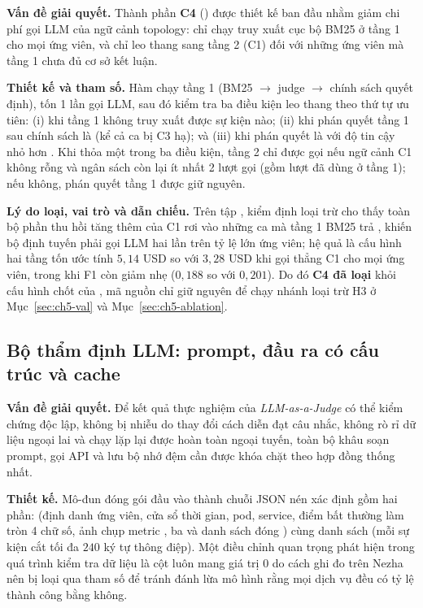 \textbf{Vấn đề giải quyết.} Thành phần \textbf{C4} () được thiết kế ban đầu nhằm giảm chi phí gọi LLM của ngữ cảnh topology: chỉ chạy truy xuất cục bộ BM25 ở tầng 1 cho mọi ứng viên, và chỉ leo thang sang tầng 2 (C1) đối với những ứng viên mà tầng 1 chưa đủ cơ sở kết luận.

\textbf{Thiết kế và tham số.} Hàm  chạy tầng 1 (BM25 $\to$ judge $\to$ chính sách quyết định), tốn 1 lần gọi LLM, sau đó kiểm tra ba điều kiện leo thang theo thứ tự ưu tiên: (i)  khi tầng 1 không truy xuất được sự kiện nào; (ii)  khi phán quyết tầng 1 sau chính sách là  (kể cả ca bị C3 hạ); và (iii)  khi phán quyết là  với độ tin cậy nhỏ hơn . Khi thỏa một trong ba điều kiện, tầng 2 chỉ được gọi nếu ngữ cảnh C1 không rỗng và ngân sách còn lại ít nhất 2 lượt gọi (gồm lượt đã dùng ở tầng 1); nếu không, phán quyết tầng 1 được giữ nguyên.

\textbf{Lý do loại, vai trò và dẫn chiếu.} Trên tập , kiểm định loại trừ cho thấy toàn bộ phần thu hồi tăng thêm của C1 rơi vào những ca mà tầng 1 BM25 trả , khiến bộ định tuyến phải gọi LLM hai lần trên tỷ lệ lớn ứng viên; hệ quả là cấu hình hai tầng tốn ước tính $5{,}14$ USD so với $3{,}28$ USD khi gọi thẳng C1 cho mọi ứng viên, trong khi F1 còn giảm nhẹ ($0{,}188$ so với $0{,}201$). Do đó \textbf{C4 đã loại} khỏi cấu hình chốt của \CTAV{}, mã nguồn chỉ giữ nguyên để chạy nhánh loại trừ H3 ở Mục~\ref{sec:ch5-val} và Mục~\ref{sec:ch5-ablation}.

\subsection{Bộ thẩm định LLM: prompt, đầu ra có cấu trúc và cache}
\label{sec:ch4-judge}

\textbf{Vấn đề giải quyết.} Để kết quả thực nghiệm của \emph{LLM-as-a-Judge} có thể kiểm chứng độc lập, không bị nhiễu do thay đổi cách diễn đạt câu nhắc, không rò rỉ dữ liệu ngoại lai và chạy lặp lại được hoàn toàn ngoại tuyến, toàn bộ khâu soạn prompt, gọi API và lưu bộ nhớ đệm cần được khóa chặt theo hợp đồng thống nhất.

\textbf{Thiết kế.} Mô-đun  đóng gói đầu vào thành chuỗi JSON nén xác định gồm hai phần:  (định danh ứng viên, cửa sổ thời gian, pod, service, điểm bất thường làm tròn 4 chữ số, ảnh chụp metric , ba  và danh sách đóng ) cùng danh sách  (mỗi sự kiện cắt tối đa $240$ ký tự thông điệp). Một điều chỉnh quan trọng phát hiện trong quá trình kiểm tra dữ liệu là cột  luôn mang giá trị $0$ do cách ghi đo trên Nezha nên bị loại qua tham số  để tránh đánh lừa mô hình rằng mọi dịch vụ đều có tỷ lệ thành công bằng không.

